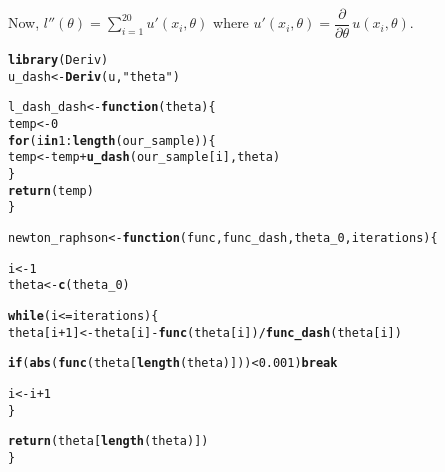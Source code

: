 \documentclass[11pt, a4paper]{article}\usepackage[]{graphicx}\usepackage[]{xcolor}
\makeatletter
\newcommand{\hlnum}[1]{\textcolor[rgb]{0.686,0.059,0.569}{#1}}%
\newcommand{\hlsng}[1]{\textcolor[rgb]{0.192,0.494,0.8}{#1}}%
\newcommand{\hlopt}[1]{\textcolor[rgb]{0,0,0}{#1}}%
\newcommand{\hldef}[1]{\textcolor[rgb]{0.345,0.345,0.345}{#1}}%
\newcommand{\hlkwa}[1]{\textcolor[rgb]{0.161,0.373,0.58}{\textbf{#1}}}%
\newcommand{\hlkwb}[1]{\textcolor[rgb]{0.69,0.353,0.396}{#1}}%
\newcommand{\hlkwc}[1]{\textcolor[rgb]{0.333,0.667,0.333}{#1}}%
\newcommand{\hlkwd}[1]{\textcolor[rgb]{0.737,0.353,0.396}{\textbf{#1}}}%
\newenvironment{kframe}{%
 \def\at@end@of@kframe{}%
 \ifinner\ifhmode%
  \def\at@end@of@kframe{\end{minipage}}%
  \begin{minipage}{\columnwidth}%
 \fi\fi%
 \def\FrameCommand##1{\hskip\@totalleftmargin \hskip-\fboxsep
 \colorbox{shadecolor}{##1}\hskip-\fboxsep
     \hskip-\linewidth \hskip-\@totalleftmargin \hskip\columnwidth}%
 \MakeFramed {\advance\hsize-\width
   \@totalleftmargin\z@ \linewidth\hsize
   \@setminipage}}%
 {\par\unskip\endMakeFramed%
 \at@end@of@kframe}
\newenvironment{knitrout}{}{} %
\makeatother
\begin{document}
Now, $l''(\theta) = \sum \limits_{i = 1}^{20} u'(x_i, \theta)$ where $u'(x_i, \theta) = \dfrac{\partial}{\partial \theta} \, u(x_i, \theta)$.

\begin{knitrout}
\color{fgcolor}\begin{kframe}
\begin{alltt}
\hlkwd{library}\hldef{(Deriv)}
\hldef{u_dash} \hlkwb{<-} \hlkwd{Deriv}\hldef{(u,} \hlsng{"theta"}\hldef{)}
\end{alltt}
\end{kframe}
\end{knitrout}

\begin{knitrout}
\color{fgcolor}\begin{kframe}
\begin{alltt}
\hldef{l_dash_dash} \hlkwb{<-} \hlkwa{function}\hldef{(}\hlkwc{theta}\hldef{)\{}
  \hldef{temp} \hlkwb{<-} \hlnum{0}
  \hlkwa{for} \hldef{(i} \hlkwa{in} \hlnum{1}\hlopt{:}\hlkwd{length}\hldef{(our_sample)) \{}
    \hldef{temp} \hlkwb{<-} \hldef{temp} \hlopt{+} \hlkwd{u_dash}\hldef{(our_sample[i], theta)}
  \hldef{\}}
  \hlkwd{return}\hldef{(temp)}
\hldef{\}}
\end{alltt}
\end{kframe}
\end{knitrout}

\begin{knitrout}
\color{fgcolor}\begin{kframe}
\begin{alltt}
\hldef{newton_raphson} \hlkwb{<-} \hlkwa{function}\hldef{(}\hlkwc{func}\hldef{,} \hlkwc{func_dash}\hldef{,} \hlkwc{theta_0}\hldef{,} \hlkwc{iterations}\hldef{)\{}

  \hldef{i} \hlkwb{<-} \hlnum{1}
  \hldef{theta} \hlkwb{<-} \hlkwd{c}\hldef{(theta_0)}

  \hlkwa{while}\hldef{(i} \hlopt{<=} \hldef{iterations)\{}
    \hldef{theta[i}\hlopt{+}\hlnum{1}\hldef{]} \hlkwb{<-} \hldef{theta[i]} \hlopt{-} \hlkwd{func}\hldef{(theta[i])} \hlopt{/} \hlkwd{func_dash}\hldef{(theta[i])}

    \hlkwa{if}\hldef{(}\hlkwd{abs}\hldef{(}\hlkwd{func}\hldef{(theta[}\hlkwd{length}\hldef{(theta)]))} \hlopt{<} \hlnum{0.001}\hldef{)} \hlkwa{break}

    \hldef{i} \hlkwb{<-} \hldef{i} \hlopt{+} \hlnum{1}
  \hldef{\}}

  \hlkwd{return}\hldef{(theta[}\hlkwd{length}\hldef{(theta)])}
\hldef{\}}
\end{alltt}
\end{kframe}
\end{knitrout}
\end{document}
